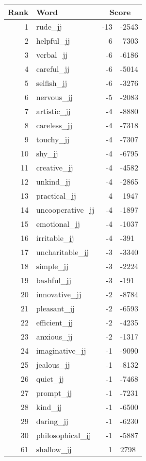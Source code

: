 \begin{longtable}[!htbp]{| rlr@{.}l |}
    \hline
    \textbf{Rank} & \textbf{Word} & \multicolumn{2}{c|}{\textbf{Score}} \\
    \hline
    \endhead
    1 & rude\_jj & -13 & -2543 \\
    2 & helpful\_jj & -6 & -7303 \\
    3 & verbal\_jj & -6 & -6186 \\
    4 & careful\_jj & -6 & -5014 \\
    5 & selfish\_jj & -6 & -3276 \\
    6 & nervous\_jj & -5 & -2083 \\
    7 & artistic\_jj & -4 & -8880 \\
    8 & careless\_jj & -4 & -7318 \\
    9 & touchy\_jj & -4 & -7307 \\
    10 & shy\_jj & -4 & -6795 \\
    11 & creative\_jj & -4 & -4582 \\
    12 & unkind\_jj & -4 & -2865 \\
    13 & practical\_jj & -4 & -1947 \\
    14 & uncooperative\_jj & -4 & -1897 \\
    15 & emotional\_jj & -4 & -1037 \\
    16 & irritable\_jj & -4 & -391 \\
    17 & uncharitable\_jj & -3 & -3340 \\
    18 & simple\_jj & -3 & -2224 \\
    19 & bashful\_jj & -3 & -191 \\
    20 & innovative\_jj & -2 & -8784 \\
    21 & pleasant\_jj & -2 & -6593 \\
    22 & efficient\_jj & -2 & -4235 \\
    23 & anxious\_jj & -2 & -1317 \\
    24 & imaginative\_jj & -1 & -9090 \\
    25 & jealous\_jj & -1 & -8132 \\
    26 & quiet\_jj & -1 & -7468 \\
    27 & prompt\_jj & -1 & -7231 \\
    28 & kind\_jj & -1 & -6500 \\
    29 & daring\_jj & -1 & -6230 \\
    30 & philosophical\_jj & -1 & -5887 \\
    61 & shallow\_jj & 1 & 2798 \\

\end{longtable}
